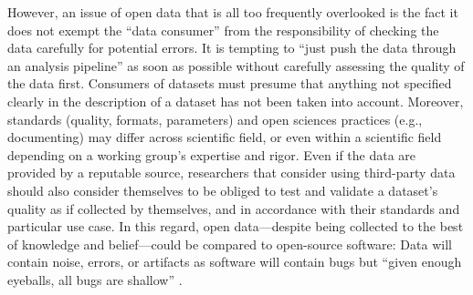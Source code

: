 However, an issue of open data that is all too frequently overlooked is the fact
it does not exempt the ``data consumer'' from the responsibility of checking the
data carefully for potential errors.
%
It is tempting to ``just push the data through an analysis pipeline'' as soon as
possible without carefully assessing the quality of the data first.
Consumers of datasets must presume that anything not specified clearly in the
description of a dataset has not been taken into account.
Moreover, standards (quality, formats, parameters) and open sciences practices
(e.g., documenting) may differ across scientific field, or even within a
scientific field depending on a working group's expertise and rigor.
Even if the data are provided by a reputable source, researchers that consider
using third-party data should also consider themselves to be obliged to test and
validate a dataset's quality as if collected by themselves, and in accordance
with their standards and particular use case.
%
In this regard, open data---despite being collected to the best of knowledge and
belief---could be compared to open-source software:
Data will contain noise, errors, or artifacts as software will contain bugs but
``given enough eyeballs, all bugs are shallow'' \citep[][p.
30]{raymond1999cathedral}.



